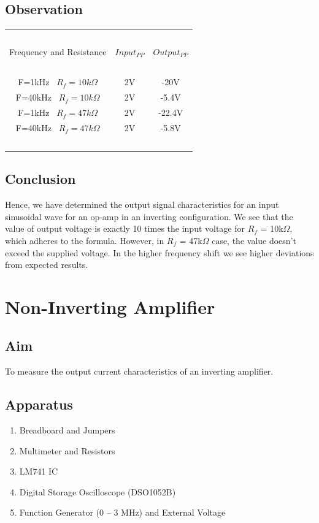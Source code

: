 \documentclass{article}
\begin{document}
\subsection{Observation}
\begin{center}
\begin{tabular}{| c | c | c |} 
 \hline
    \ & \ & \ \\
    Frequency and Resistance & $Input_{PP}$ & $Output_{PP}$ \\ [1em]
    \hline
    \ & \ & \ \\
    F=1kHz \ $R_f=10k\Omega$  & 2V & -20V \\
    F=40kHz \ $R_f=10k\Omega$  & 2V & -5.4V \\
    F=1kHz \ $R_f=47k\Omega$  & 2V & -22.4V \\
    F=40kHz \ $R_f=47k\Omega$  & 2V & -5.8V \\
    \ & \ & \ \\
 \hline
\end{tabular}
\end{center}

\subsection{Conclusion}
Hence, we have determined the output signal characteristics for an input sinusoidal wave for an op-amp in an inverting configuration. We see that the value of output voltage is exactly 10 times the input voltage for $R_f$ = 10k$\Omega$, which adheres to the formula. However, in $R_f$ = 47k$\Omega$ case, the value doesn’t exceed the supplied voltage. In the higher frequency shift we see higher deviations from expected results.


\newpage
\section{Non-Inverting Amplifier}
\subsection{Aim}
To measure the output current characteristics of an inverting amplifier.
\subsection{Apparatus}
\begin{enumerate}
\item Breadboard and Jumpers
\item Multimeter and Resistors
\item LM741 IC
\item Digital Storage Oscilloscope (DSO1052B)
\item Function Generator (0 – 3 MHz) and External Voltage
\end{enumerate}
\end{document}
